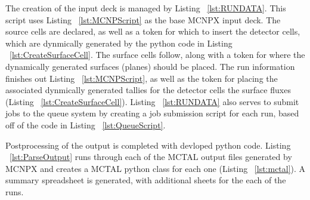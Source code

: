 
The creation of the input deck is managed by Listing ~\ref{lst:RUNDATA}.
This script uses Listing ~\ref{lst:MCNPScript} as the base MCNPX input deck.
The source cells are declared, as well as a token for which to insert the detector cells, which are dynmically generated by the python code in Listing ~\ref{lst:CreateSurfaceCell}.
The surface cells follow, along with a token for where the dynamically generated surfaces (planes) should be placed.
The run information finishes out Listing ~\ref{lst:MCNPScript}, as well as the token for placing the associated dynmically generated tallies for the detector cells the surface fluxes (Listing ~\ref{lst:CreateSurfaceCell}).
Listing ~\ref{lst:RUNDATA} also serves to submit jobs to the queue system by creating a job submission script for each run, based off of the code in Listing ~\ref{lst:QueueScript}.

Postprocessing of the output is completed with devloped python code.
Listing ~\ref{lst:ParseOutput} runs through each of the MCTAL output files generated by MCNPX and creates a MCTAL python class for each one (Listing ~\ref{lst:mctal}).
A summary spreadsheet is generated, with additional sheets for the each of the runs.









